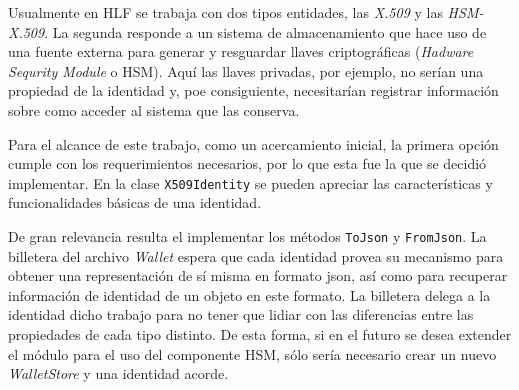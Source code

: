 Usualmente en HLF se trabaja con dos tipos entidades, las \emph{X.509} y las \emph{HSM-X.509}. La segunda responde a un sistema de almacenamiento que hace uso de una fuente externa para generar y resguardar llaves criptogr\'aficas (\emph{Hadware Sequrity Module} o HSM). Aqu\'i las llaves privadas, por ejemplo, no ser\'ian una propiedad de la identidad y, poe consiguiente, necesitar\'ian registrar informaci\'on sobre como acceder al sistema que las conserva.

Para el alcance de este trabajo, como un acercamiento inicial, la primera opci\'on cumple con los requerimientos necesarios, por lo que esta fue la que se decidi\'o implementar. En la clase \texttt{X509Identity} se pueden apreciar las caracter\'isticas y funcionalidades b\'asicas de una identidad.

De gran relevancia resulta el implementar los m\'etodos \texttt{ToJson} y \texttt{FromJson}. La billetera del archivo \emph{Wallet} espera que cada identidad provea su mecanismo para obtener una representaci\'on de s\'i misma en formato json, as\'i como para recuperar informaci\'on de identidad de un objeto en este formato. La billetera delega a la identidad dicho trabajo para no tener que lidiar con las diferencias entre las propiedades de cada tipo distinto. De esta forma, si en el futuro se desea extender el m\'odulo para el uso del componente HSM, s\'olo ser\'ia necesario crear un nuevo \emph{WalletStore} y una identidad acorde.